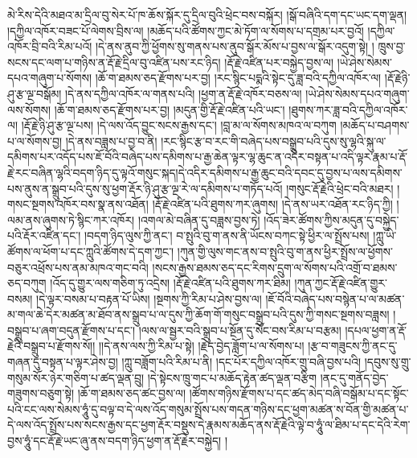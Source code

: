 མེ་རིས་དེའི་མཐའ་མ་དྲིལ་བུ་སེར་པོ་ཁ་ཆོས་སྐོར་དུ་དྲིལ་བུའི་ཕྲེང་བས་བསྐོར། །སྒོ་བཞིའི་དག་དང་ཡང་དག་ལྡན། །དཀྱིལ་འཁོར་བཟང་པོ་ལེགས་བྲིས་ལ། །མཆོད་པའི་ཚོགས་ཀྱང་མེ་ཏོག་ལ་སོགས་པ་དགྲམ་པར་བྱའོ། །དཀྱིལ་འཁོར་བྲི་བའི་རིམ་པའོ། །དེ་ནས་ནུབ་ཀྱི་ཕྱོགས་སུ་གནས་པས་ནུབ་སྒོར་མོས་པ་བྱས་ལ་སྒོར་འདུག་སྟེ། ། ཁྲུས་བྱ་སངས་དང་ལག་པ་གཉིས་ན་རྡོ་རྗེ་དྲིལ་བུ་འཛིན་པས་རང་ཉིད། །རྡོ་རྗེ་འཛིན་པར་བསྐྱེད་བྱས་ལ། །ཡེ་ཤེས་སེམས་དཔའ་གཞུག་པ་སོགས། །ཆོ་ག་ཐམས་ཅད་རྫོགས་པར་བྱ། །རང་སྙིང་པདྨའི་སྟེང་དུ་ཟླ་བའི་དཀྱིལ་འཁོར་ལ། །རྡོ་རྗེཉི་ཤུ་རྩ་ལྔ་བསྒོམ། །དེ་ནས་དཀྱིལ་འཁོར་ལ་གནས་པའི། །ཕྱག་ན་རྡོ་རྗེ་འཁོར་བཅས་ལ། །ཡེ་ཤེས་སེམས་དཔའ་གཞུག་ལས་སོགས། །ཆོ་ག་ཐམས་ཅད་རྫོགས་པར་བྱ། །མདུན་གྱི་རྡོ་རྗེ་འཛིན་པའི་ཡང་། །ཐུགས་ཀར་ཟླ་བའི་དཀྱིལ་འཁོར་ལ། །རྡོ་རྗེ་ཉི་ཤུ་རྩ་ལྔ་པས། །དེ་ལས་འོད་བྱུང་སངས་རྒྱས་དང་། །བླ་མ་ལ་སོགས་མཁའ་ལ་བཀུག །མཆོད་པ་བཤགས་པ་ལ་སོགས་བྱ། །དེ་ནས་བཟླས་པ་བྱ་བ་ནི། །རང་སྙིང་རྩ་བ་རང་གི་བཞེད་པས་བསྒྲུབ་པའི་དུས་སུ་ལྷའི་སྐུ་ལ་དམིགས་པར་འདོད་པས་ཇོ་བོའི་བཞེད་པས་དམིགས་པ་རྒྱ་ཆེན་ལྟར་ལྷ་ཆུང་ན་འདིར་བསྟན་པ་འདི་ལྟར་རྣམ་པ་རྡོ་རྗེ་རང་བཞིན་ལྷའི་བདག་ཉིད་དུ་ལྟའོ་གསུང་སྐད།དེ་འདིར་དམིགས་པ་རྒྱ་ཆུང་བའི་དབང་དུ་བྱས་པ་ལས་དམིགས་པས་ནུས་ན་སྒྲུབ་པའི་དུས་སུ་ཕྱག་རྡོར་ཉི་ཤུ་རྩ་ལྔ་རེ་ལ་དམིགས་པ་གཏོད་པའོ། །གསུང་རྡོ་རྗེའི་ཕྲེང་བའི་མཐར། །གསང་སྔགས་འཁོར་བས་སྣ་ནས་འཐོན། །རྡོ་རྗེ་འཛིན་པའི་ཐུགས་ཀར་ཞུགས། །དེ་ནས་ཡར་འཐོན་རང་ཉིད་ཀྱི། །ལམ་ནས་ཞུགས་ཏེ་སྙིང་ཀར་འཁོར། །འགལ་མེ་བཞིན་དུ་བཟླས་བྱས་ཏེ། །འོད་ཟེར་ཚོགས་ཀྱིས་མདུན་དུ་བསྐྱེད་པའི་རྡོར་འཛིན་དང་། །བདག་ཉིད་ལུས་ཀྱི་ནང་། བ་སྤུའི་བུ་ག་ནས་ནི་ཡོངས་བཀང་སྟེ་ཕྱིར་ལ་སྤྲོས་པས། །ཀླུ་ཡི་ཚོགས་ལ་ཕོག་པ་དང་ཀླུའི་ཚོགས་དེ་དག་ཀྱང་། །ཀུན་གྱི་ལུས་གང་ནས་བ་སྤུའི་བུ་ག་ནས་ཕྱིར་སྤྲོས་ལ་ཕྱོགས་བཅུར་འཕྲོས་པས་ནམ་མཁའ་གང་བའི། །སངས་རྒྱས་ཐམས་ཅད་དང་རིགས་དྲུག་ལ་སོགས་པའི་འགྲོ་བ་ཐམས་ཅད་བཀུག །འོད་དུ་གྱུར་ལས་གཅིག་ཏུ་འདྲེས། །རྡོ་རྗེ་འཛིན་པའི་ཐུགས་ཀར་ཐིམ། །ཀུན་ཀྱང་རྡོ་རྗེ་འཛིན་གྱུར་བསམ། །དེ་ལྟར་བསམ་པ་བརྟན་པོ་ཡིས། །སྔགས་ཀྱི་རིམ་པ་ཤེས་བྱས་ལ། །ཇོ་བོའི་བཞེད་པས་བསྙེན་པ་ལ་མཚན་མ་གལ་ཆེ་དེར་མཚན་མ་ཐོབ་ནས་སྒྲུབ་པ་ལ་དུས་ཀྱི་ཆོག་གོ་གསུང་བསྒྲུབ་པའི་དུས་ཀྱི་གསང་སྔགས་བཟླས། །བསྒྲུབ་པ་ཞག་བདུན་རྫོགས་པ་དང་། །ལས་ལ་སྦྱར་བའི་སྒྲུབ་པ་སྔོན་དུ་སོང་བས་རིམ་པ་བརྩམ། །དཔལ་ཕྱག་ན་རྡོ་རྗེའི་བསྒྲུབ་པ་རྫོགས་སོ།། །།དེ་ནས་ལས་ཀྱི་རིམ་པ་སྟེ། །རྗེད་བྱེད་ཟློག་པ་ལ་སོགས་པ། །རྩ་བ་གཟུངས་ཀྱི་ནང་དུ་གཞན་དུ་བསྟན་པ་ལྟར་ཤེས་བྱ། །ཀླུ་བཟློག་པའི་རིམ་པ་ནི། །དང་པོར་དཀྱིལ་འཁོར་གྲུ་བཞི་བྱས་པའི། །དབུས་སུ་གྲུ་གསུམ་སོར་ཉེར་གཅིག་པ་ཚད་ལྡན་བྲུ། །དེ་སྟེངས་ཁྲུ་གང་པ་མཆོད་རྟེན་ཚད་ལྡན་བརྩིག །ནང་དུ་གནོད་བྱེད་གཟུགས་བཅུག་སྟེ། །ཆོ་ག་ཐམས་ཅད་ཚང་བྱས་ལ། །ཚོགས་གཉིས་རྫོགས་པ་དང་ཚད་མེད་བཞི་བསྒོམ་པ་དང་སྟོང་པའི་ངང་ལས་སེམས་ཧཱུཾ་དུ་བལྟ་བ་དེ་ལས་འོད་གསུམ་སྤྲོས་པས་གདན་གཉིས་དང་ཕྱག་མཚན་ས་བོན་གྱི་མཚན་པ་དེ་ལས་འོད་སྤྲོས་པས་སངས་རྒྱས་དང་ཕྱག་རྡོར་བསྡུས་དེ་རྣམས་མཆོད་ནས་རྡོ་རྗེའི་ལྟེ་བ་ཧཱུཾ་ལ་ཐིམ་པ་དང་དེའི་རེག་བྱས་ཧཱུཾ་དང་རྡོ་རྗེ་ཡང་ཞུ་ནས་བདག་ཉིད་ཕྱག་ན་རྡོ་རྗེར་བསྐྱེད། །
